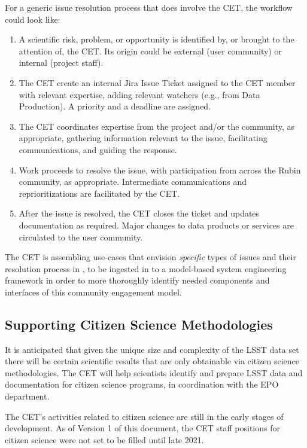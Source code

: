 \documentclass[DM,lsstdraft,toc]{lsstdoc}
\begin{document}
For a generic issue resolution process that does involve the CET, the workflow could look like:
\begin{enumerate}
\item A scientific risk, problem, or opportunity is identified by, or brought to the attention of, the CET. Its origin could be external (user community) or internal (project staff).
\item The CET create an internal Jira Issue Ticket assigned to the CET member with relevant expertise, adding relevant watchers (e.g., from Data Production). A priority and a deadline are assigned. 
\item The CET coordinates expertise from the project and/or the community, as appropriate, gathering information relevant to the issue, facilitating communications, and guiding the response.
\item Work proceeds to resolve the issue, with participation from across the Rubin community, as appropriate. Intermediate communications and reprioritizations are facilitated by the CET.
\item After the issue is resolved, the CET closes the ticket and updates documentation as required. Major changes to data products or services are circulated to the user community.
\end{enumerate}

The CET is assembling use-cases that envision \textit{specific} types of issues and their resolution process in , to be ingested in to a model-based system engineering framework in order to more thoroughly identify needed components and interfaces of this community engagement model.


\subsection{Supporting Citizen Science Methodologies}\label{ssec:mod_citizen}

It is anticipated that given the unique size and complexity of the LSST data set there will be certain scientific results that are only obtainable via citizen science methodologies.
The CET will help scientists identify and prepare LSST data and documentation for citizen science programs, in coordination with the EPO department. 

The CET's activities related to citizen science are still in the early stages of development.
As of Version 1 of this document, the CET staff positions for citizen science were not set to be filled until late 2021.
\end{document}
